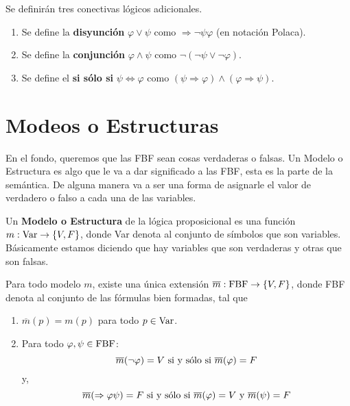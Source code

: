 \documentclass[12pt]{report}
\newcounter{it}
\theoremstyle{largebreak}
\newcommand\cf[3]{\ensuremath{#1:#2\rightarrow#3}}
\begin{document}
    \begin{mydef}
        Se definirán tres conectivas lógicos adicionales.
        \begin{enumerate}
            \item Se define la \textbf{disyunción} $\varphi\lor\psi$ como $\Rightarrow\neg\psi\varphi$ (en notación Polaca).
            \item Se define la \textbf{conjunción} $\varphi\land\psi$ como $\neg(\neg\psi\lor\neg\varphi)$.
            \item Se define el \textbf{si sólo si} $\psi\iff\varphi$ como $(\psi\Rightarrow\varphi)\land(\varphi\Rightarrow\psi)$.
        \end{enumerate}
    \end{mydef}

    \section{Modeos o Estructuras}

    En el fondo, queremos que las FBF sean cosas verdaderas o falsas. Un Modelo o Estructura es algo que le va a dar significado a las FBF, esta es la parte de la semántica. De alguna manera va a ser una forma de asignarle el valor de verdadero o falso a cada una de las variables.

    \begin{mydef}
        Un \textbf{Modelo o Estructura} de la lógica proposicional es una función $\cf{m}{\textup{Var}}{\left\{V,F\right\}}$, donde Var denota al conjunto de símbolos que son variables. Básicamente estamos diciendo que hay variables que son verdaderas y otras que son falsas.
    \end{mydef}

    \begin{theor}
        Para todo modelo $m$, existe una única extensión $\cf{\overline{m}}{\textup{FBF}}{\left\{V,F\right\}}$, donde FBF denota al conjunto de las fórmulas bien formadas, tal que
        \begin{enumerate}
            \item $\overline{m}(p)=m(p)$ para todo $p\in\textup{Var}$.
            \item Para todo $\varphi,\psi\in\textup{FBF}$:
            \begin{equation*}
                \overline{m}(\neg\varphi)=V\textup{ si y sólo si } \overline{m}(\varphi)=F
            \end{equation*}
            y,
            \begin{equation*}
                \overline{m}(\Rightarrow\varphi\psi)=F\textup{ si y sólo si }\overline{m}(\varphi)=V\textup{ y } \overline{m}(\psi)=F
            \end{equation*}
        \end{enumerate}
    \end{theor}
\end{document}
